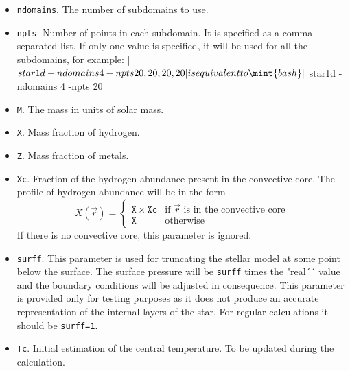 \begin{itemize}
\item {\tt ndomains}. The number of subdomains to use.
\item {\tt npts}. Number of points in each subdomain. It is specified as a 
comma-separated list. 
If only one value is specified, it will be used for all the subdomains, for example:
|$ star1d -ndomains 4 -npts 20,20,20,20|  %
is equivalent to
\mint{bash}|$ star1d -ndomains 4 -npts 20|  %

\item {\tt M}. The mass in units of solar mass.
\item {\tt X}. Mass fraction of hydrogen.
\item {\tt Z}. Mass fraction of metals.
\item {\tt Xc}. Fraction of the hydrogen abundance present in the convective core. The profile
of hydrogen abundance will be in the form
$$X(\vec r)=\left\{
\begin{array}{ll}
\mathtt{X}\times \mathtt{Xc}&\mbox{if $\vec r$ is in the convective core}\\
\mathtt{X}&\mbox{otherwise}
\end{array}\right.$$
If there is no convective core, this parameter is ignored.

\item {\tt surff}. This parameter is used for truncating the stellar model
at some point below the surface. The surface pressure will be {\tt surff}
times the "real´´ value and the boundary conditions will be adjusted
in consequence. This parameter is provided only for testing purposes as
it does not produce an accurate representation of the internal layers
of the star. For regular calculations it should be {\tt surff=1}.

\item {\tt Tc}. Initial estimation of the central temperature. To be
updated during the calculation.


\end{itemize}

